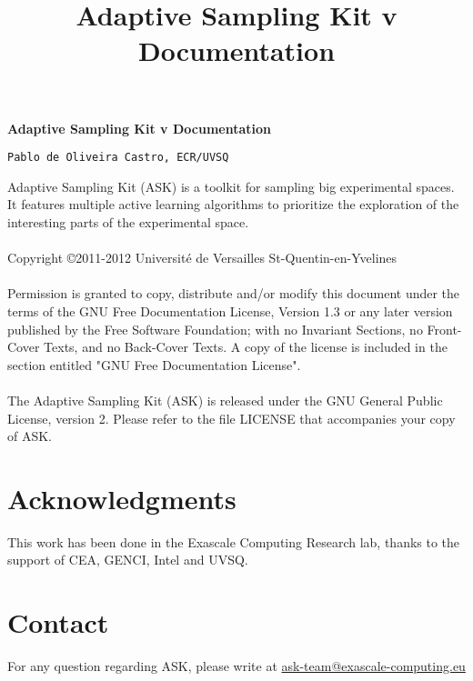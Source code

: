 \documentclass[a4]{report}
\begin{document}
\title{Adaptive Sampling Kit v Documentation}

\maketitle
\tableofcontents

\break
 \begin{center}

   \textbf{Adaptive Sampling Kit v Documentation} 

 \bigskip
     \texttt{Pablo de Oliveira Castro, ECR/UVSQ}
 \bigskip
 
\end{center}

Adaptive Sampling Kit (ASK) is a toolkit for sampling big experimental spaces. It features multiple active learning algorithms to prioritize the exploration of the interesting parts of the experimental space.

\paragraph{}
\noindent Copyright \copyright2011-2012 Universit\'e de Versailles St-Quentin-en-Yvelines
\paragraph{}
\noindent Permission is granted to copy, distribute and/or modify this document
under the terms of the GNU Free Documentation License, Version 1.3
or any later version published by the Free Software Foundation;
with no Invariant Sections, no Front-Cover Texts, and no Back-Cover Texts.
A copy of the license is included in the section entitled "GNU
Free Documentation License".
\paragraph{}
The Adaptive Sampling Kit (ASK) is released under the GNU 
General Public License, version 2. Please refer to the file LICENSE that 
accompanies your copy of ASK. 


\section*{Acknowledgments}
This work has been done in the Exascale Computing Research lab, thanks to the support of CEA, GENCI, Intel and UVSQ.

\section*{Contact}
For any question regarding ASK, please write at \href{mailto:ask-team@exascale-computing.eu}{ask-team@exascale-computing.eu}
\end{document}
